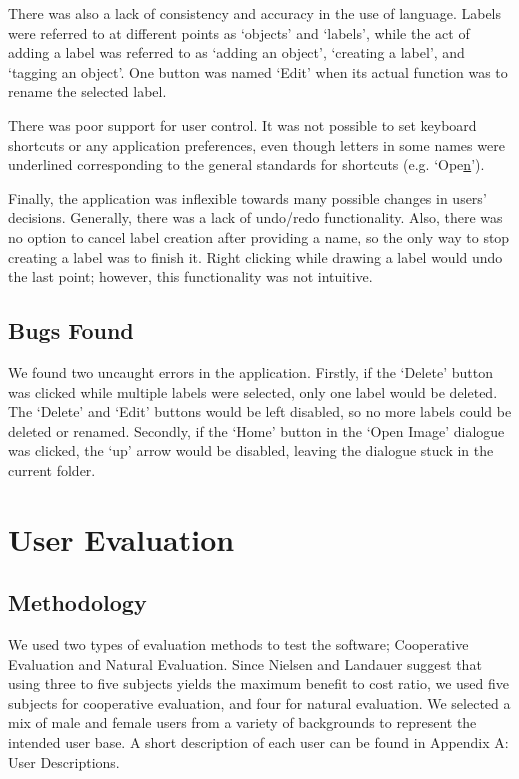 \documentclass[11pt,twocolumn]{article}
\begin{document}
There was also a lack of consistency and accuracy in the use of language.
Labels were referred to at different points as `objects' and `labels', while
the act of adding a label was referred to as `adding an object', `creating a
label', and `tagging an object'. One button was named `Edit' when its actual
function was to rename the selected label.

There was poor support for user control. It was not possible to set keyboard
shortcuts or any application preferences, even though letters in some names
were underlined corresponding to the general standards for shortcuts (e.g.
`Ope\underline{n}'). 

Finally, the application was inflexible towards many possible changes in users’
decisions. Generally, there was a lack of undo/redo functionality. Also, there
was no option to cancel label creation after providing a name, so the only way
to stop creating a label was to finish it. Right clicking while drawing a label
would undo the last point; however, this functionality was not intuitive. 

\subsection{Bugs Found}

We found two uncaught errors in the application. Firstly, if the `Delete'
button was clicked while multiple labels were selected, only one label would be
deleted. The `Delete' and `Edit' buttons would be left disabled, so no more
labels could be deleted or renamed. Secondly, if the `Home' button in the `Open
Image' dialogue was clicked, the `up' arrow would be disabled, leaving the
dialogue stuck in the current folder.

\section{User Evaluation}

\subsection{Methodology}

We used two types of evaluation methods to test the software; Cooperative
Evaluation and Natural Evaluation. Since Nielsen and Landauer suggest
that using three to five subjects yields the maximum benefit to cost
ratio\cite{nielsen1993}, we used five subjects for cooperative evaluation, and
four for natural evaluation. We selected a mix of male and female users from a
variety of backgrounds to represent the intended user base. A short description
of each user can be found in Appendix A: User Descriptions.
\end{document}
